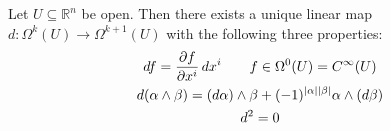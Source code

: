 \documentclass[notoc,notitlepage]{tufte-book}
\begin{document}
\begin{thm}\label{thm:defining_properties_of_the_exterior_derivative}
  Let $U \subseteq \mathbb{R}^n$ be open. Then there exists a unique linear map $d :
  \Omega^k(U) \to \Omega^{ k + 1 }(U)$ with the following three properties:
  \begin{gather}
    \mathop{}\!d{f} = \frac{\partial f}{\partial x^i} \mathop{}\!d{x^i} \qquad f \in \Omega^0(U) =
      C^{\infty}(U) \label{eq:exterior_derivative_for_0_forms} \\
    \mathop{}\!d{(\alpha \land \beta)} = (\mathop{}\!d{\alpha}) \land \beta +
      (-1)^{\left|\alpha\right|\left|\beta\right|} \alpha \land (\mathop{}\!d{\beta})
      \label{eq:exterior_derivative_on_wedge_products} \\
    \mathop{}\!d{^2} = 0 \label{eq:composition_of_exterior_derivatives_is_zero}
  \end{gather}
\end{thm}
\end{document}
